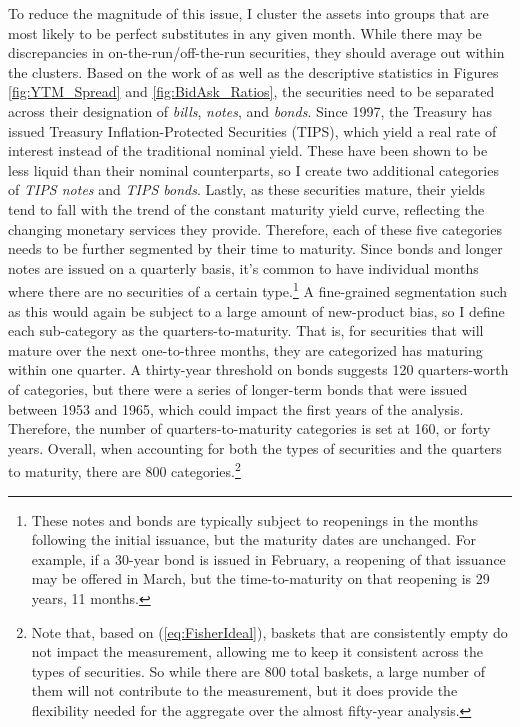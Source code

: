 \documentclass[11pt,a4paper,margin=1.5in]{article}
\begin{document}
To reduce the magnitude of this issue, I cluster the assets into groups that are most likely to be perfect substitutes in any given month.
While there may be discrepancies in on-the-run/off-the-run securities, they should average out within the clusters. 
Based on the work of \citet{Amihud-Mendelson:1991} as well as the descriptive statistics in Figures \ref{fig:YTM_Spread} and \ref{fig:BidAsk_Ratios}, the securities need to be separated across their designation of {\em bills}, {\em notes}, and {\em bonds}.
Since 1997, the Treasury has issued Treasury Inflation-Protected Securities (TIPS), which yield a real rate of interest instead of the traditional nominal yield.
These have been shown to be less liquid than their nominal counterparts, so I create two additional categories of {\em TIPS notes} and {\em TIPS bonds}. 
Lastly, as these securities mature, their yields tend to fall with the trend of the constant maturity yield curve, reflecting the changing monetary services they provide.
Therefore, each of these five categories needs to be further segmented by their time to maturity.
Since bonds and longer notes are issued on a quarterly basis, it's common to have individual months where there are no securities of a certain type.\footnote{
	These notes and bonds are typically subject to reopenings in the months following the initial issuance, but the maturity dates are unchanged.
	For example, if a 30-year bond is issued in February, a reopening of that issuance may be offered in March, but the time-to-maturity on that reopening is 29 years, 11 months.}
A fine-grained segmentation such as this would again be subject to a large amount of new-product bias, so I define each sub-category as the quarters-to-maturity.
That is, for securities that will mature over the next one-to-three months, they are categorized has maturing within one quarter. 
A thirty-year threshold on bonds suggests 120 quarters-worth of categories, but there were a series of longer-term bonds that were issued between 1953 and 1965, which could impact the first years of the analysis.
Therefore, the number of quarters-to-maturity categories is set at 160, or forty years. 
Overall, when accounting for both the types of securities and the quarters to maturity, there are 800 categories.\footnote{
	Note that, based on (\ref{eq:FisherIdeal}), baskets that are consistently empty do not impact the measurement, allowing me to keep it consistent across the types of securities.
	So while there are 800 total baskets, a large number of them will not contribute to the measurement, but it does provide the flexibility needed for the aggregate over the almost fifty-year analysis.}
	
\end{document}
